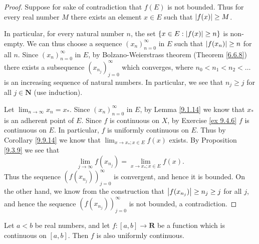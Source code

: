 \begin{proof}
    Suppose for sake of contradiction that \(f(E)\) is not bounded.
    Thus for every real number \(M\) there exists an element \(x \in E\) such that \(\abs*{f(x)} \geq M\).

    In particular, for every natural number \(n\), the set \(\{x \in E : \abs*{f(x)} \geq n\}\) is non-empty.
    We can thus choose a sequence \((x_n)_{n = 0}^\infty\) in \(E\) such that \(\abs*{f(x_n)} \geq n\) for all \(n\).
    Since \((x_n)_{n = 0}^\infty\) in \(E\), by Bolzano-Weierstrass theorem (Theorem \ref{6.6.8}) there exists a subsequence \((x_{n_j})_{j = 0}^\infty\) which converges, where \(n_0 < n_1 < n_2 < \dots\) is an increasing sequence of natural numbers.
    In particular, we see that \(n_j \geq j\) for all \(j \in \mathbf{N}\) (use induction).

    Let \(\lim_{n \to \infty} x_n = x_*\).
    Since \((x_n)_{n = 0}^\infty\) in \(E\), by Lemma \ref{9.1.14} we know that \(x_*\) is an adherent point of \(E\).
    Since \(f\) is continuous on \(X\), by Exercise \ref{ex 9.4.6} \(f\) is continuous on \(E\).
    In particular, \(f\) is uniformly continuous on \(E\).
    Thus by Corollary \ref{9.9.14} we know that \(\lim_{x \to x_* ; x \in E} f(x)\) exists.
    By Proposition \ref{9.3.9} we see that
    \[
        \lim_{j \to \infty} f(x_{n_j}) = \lim_{x \to x_* ; x \in E} f(x).
    \]
    Thus the sequence \((f(x_{n_j}))_{j = 0}^\infty\) is convergent, and hence it is bounded.
    On the other hand, we know from the construction that \(\abs*{f(x_{n_j})} \geq n_j \geq j\) for all \(j\), and hence the sequence \((f(x_{n_j}))_{j = 0}^\infty\) is not bounded, a contradiction.
\end{proof}

\begin{theorem}\label{9.9.16}
    Let \(a < b\) be real numbers, and let \(f : [a, b] \to \mathbf{R}\) be a function which is continuous on \([a, b]\).
    Then \(f\) is also uniformly continuous.
\end{theorem}

